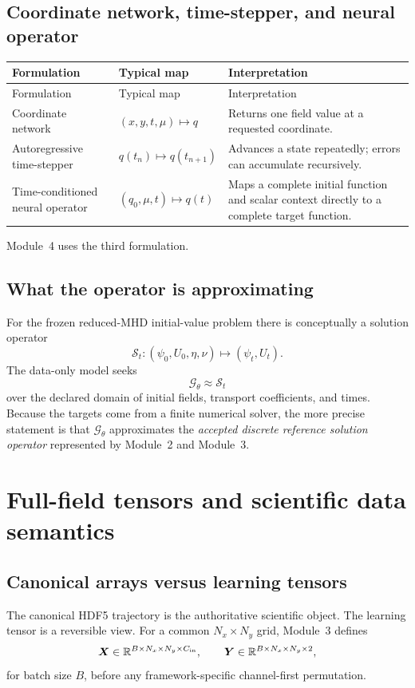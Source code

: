 \documentclass[11pt]{article}
\newcommand{\mat}[1]{\bm{#1}}
\begin{document}
\subsection{Coordinate network, time-stepper, and neural operator}
\begin{longtable}{p{}p{}p{}}
\toprule
Formulation & Typical map & Interpretation \\
\midrule
\endfirsthead
\toprule
Formulation & Typical map & Interpretation \\
\midrule
\endhead
Coordinate network & $(x,y,t,\mu)\mapsto q$ & Returns one field value at a requested coordinate. \\
Autoregressive time-stepper & $q(t_n)\mapsto q(t_{n+1})$ & Advances a state repeatedly; errors can accumulate recursively. \\
Time-conditioned neural operator & $(q_0,\mu,t)\mapsto q(t)$ & Maps a complete initial function and scalar context directly to a complete target function. \\
\bottomrule
\end{longtable}
Module~4 uses the third formulation.

\subsection{What the operator is approximating}
For the frozen reduced-MHD initial-value problem there is conceptually a solution operator
\[
\mathcal{S}_t:(\psi_0,U_0,\eta,\nu)\mapsto(\psi_t,U_t).
\]
The data-only model seeks
\[
\mathcal{G}_\theta\approx\mathcal{S}_t
\]
over the declared domain of initial fields, transport coefficients, and times. Because the targets come from a finite numerical solver, the more precise statement is that $\mathcal{G}_\theta$ approximates the \emph{accepted discrete reference solution operator} represented by Module~2 and Module~3.

\section{Full-field tensors and scientific data semantics}
\label{sec:tensors}

\subsection{Canonical arrays versus learning tensors}
The canonical HDF5 trajectory is the authoritative scientific object. The learning tensor is a reversible view. For a common $N_x\times N_y$ grid, Module~3 defines
\[
\mat X\in\mathbb{R}^{B\times N_x\times N_y\times C_{\rm in}},\qquad
\mat Y\in\mathbb{R}^{B\times N_x\times N_y\times 2},
\]
for batch size $B$, before any framework-specific channel-first permutation.
\end{document}
